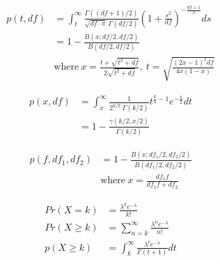 \begin{align*} 
    p(t,df) &= \int_t^{\infty}\frac{\Gamma((df+1)/2)}{\sqrt{df\cdot\pi}~\Gamma(df/2)}\left(1+\frac{s^2}{df}\right)^{-\frac{df+1}{2}}ds\\
    &= 1-\frac{B(x;df/2,df/2)}{B(df/2,df/2)} \\
    &\text{where}~x =\frac{t+\sqrt{t^2+df}}{2\sqrt{t^2+df}},~t=\sqrt{\frac{(2x-1)^2df}{4x(1-x)}}
\end{align*}

\begin{align*} 
    p(x,df) &= \int_x^{\infty}\frac{1}{2^{k/2}~\Gamma(k/2)}t^{\frac{k}{2}-1}e^{-\frac{k}{2}}dt\\
    &= 1-\frac{\gamma(k/2,x/2)}{\Gamma(k/2)}
\end{align*}

\begin{align*} 
    p(f,df_1,df_2) &= 1-\frac{B(x;df_1/2,df_2/2)}{B(df_1/2,df_2/2)} \\
    &\text{where}~x =\frac{df_1f}{df_1f+df_2}
\end{align*}


\begin{align*} 
    Pr(X=k) &= \frac{\lambda^ke^{-\lambda}}{k!} \\
    Pr(X\geq k) &= \sum_{n=k}^{\infty}\frac{\lambda^ne^{-\lambda}}{n!} \\
    p(X\geq k) &= \int_{k}^{\infty}\frac{\lambda^te^{-\lambda}}{\Gamma(t+1)}dt
\end{align*}

